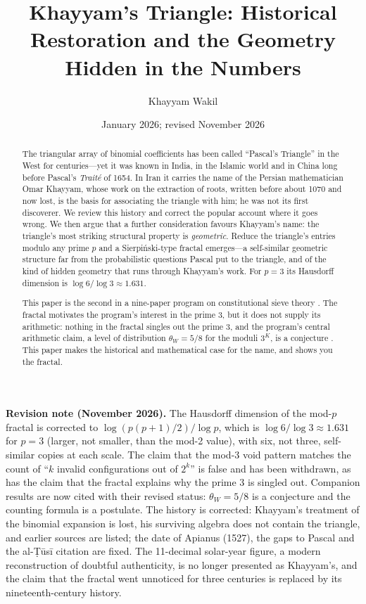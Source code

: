 \documentclass[11pt]{amsart}
\title{Khayyam's Triangle: Historical Restoration and the Geometry Hidden in the Numbers}
\author{Khayyam Wakil}
\date{January 2026; revised November 2026}
\begin{document}
\begin{abstract}
The triangular array of binomial coefficients has been called ``Pascal's Triangle'' in the West for centuries---yet it was known in India, in the Islamic world and in China long before Pascal's \emph{Traité} of 1654. In Iran it carries the name of the Persian mathematician Omar Khayyam, whose work on the extraction of roots, written before about 1070 and now lost, is the basis for associating the triangle with him; he was not its first discoverer. We review this history and correct the popular account where it goes wrong. We then argue that a further consideration favours Khayyam's name: the triangle's most striking structural property is \emph{geometric}. Reduce the triangle's entries modulo any prime $p$ and a Sierpiński-type fractal emerges---a self-similar geometric structure far from the probabilistic questions Pascal put to the triangle, and of the kind of hidden geometry that runs through Khayyam's work. For $p=3$ its Hausdorff dimension is $\log 6/\log 3 \approx 1.631$.

This paper is the second in a nine-paper program on constitutional sieve theory \cite{forcing}. The fractal motivates the program's interest in the prime 3, but it does not supply its arithmetic: nothing in the fractal singles out the prime 3, and the program's central arithmetic claim, a level of distribution $\theta_W = 5/8$ for the moduli $3^K$, is a conjecture \cite{eisenstein}. This paper makes the historical and mathematical case for the name, and shows you the fractal.
\end{abstract}

\maketitle

\noindent\textbf{Revision note (November 2026).} The Hausdorff dimension of the mod-$p$ fractal is corrected to $\log(p(p+1)/2)/\log p$, which is $\log 6/\log 3\approx 1.631$ for $p=3$ (larger, not smaller, than the mod-2 value), with six, not three, self-similar copies at each scale. The claim that the mod-3 void pattern matches the count of ``$k$ invalid configurations out of $2^k$'' is false and has been withdrawn, as has the claim that the fractal explains why the prime 3 is singled out. Companion results are now cited with their revised status: $\theta_W=5/8$ is a conjecture and the counting formula is a postulate. The history is corrected: Khayyam's treatment of the binomial expansion is lost, his surviving algebra does not contain the triangle, and earlier sources are listed; the date of Apianus (1527), the gaps to Pascal and the al-\d{T}ūsī citation are fixed. The 11-decimal solar-year figure, a modern reconstruction of doubtful authenticity, is no longer presented as Khayyam's, and the claim that the fractal went unnoticed for three centuries is replaced by its nineteenth-century history.
\end{document}
